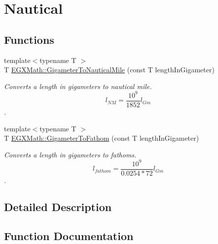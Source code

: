 \hypertarget{group___e_g_x_math-_conversions-_length_conversions-_s_i-_gigameter-_nautical}{}\section{Nautical}
\label{group___e_g_x_math-_conversions-_length_conversions-_s_i-_gigameter-_nautical}
\subsection*{Functions}
\begin{DoxyCompactItemize}
\item 
{\footnotesize template$<$typename T $>$ }\\T \mbox{\hyperlink{group___e_g_x_math-_conversions-_length_conversions-_s_i-_gigameter-_nautical_ga52d7a5290f284cdfec247ba606967867}{E\+G\+X\+Math\+::\+Gigameter\+To\+Nautical\+Mile}} (const T length\+In\+Gigameter)
\begin{DoxyCompactList}\small\item\em Converts a length in gigameters to nautical mile. \[ l_{NM}= \frac{10^{9}}{1852} l_{Gm} \]. \end{DoxyCompactList}\item 
{\footnotesize template$<$typename T $>$ }\\T \mbox{\hyperlink{group___e_g_x_math-_conversions-_length_conversions-_s_i-_gigameter-_nautical_gac09c5a61b554d3c3c2df3e414aca0e73}{E\+G\+X\+Math\+::\+Gigameter\+To\+Fathom}} (const T length\+In\+Gigameter)
\begin{DoxyCompactList}\small\item\em Converts a length in gigameters to fathoms. \[ l_{fathom}= \frac{10^{9}}{0.0254 * 72} l_{Gm} \]. \end{DoxyCompactList}\end{DoxyCompactItemize}


\subsection{Detailed Description}


\subsection{Function Documentation}
\mbox{\label{group___e_g_x_math-_conversions-_length_conversions-_s_i-_gigameter-_nautical_gac09c5a61b554d3c3c2df3e414aca0e73}} 
